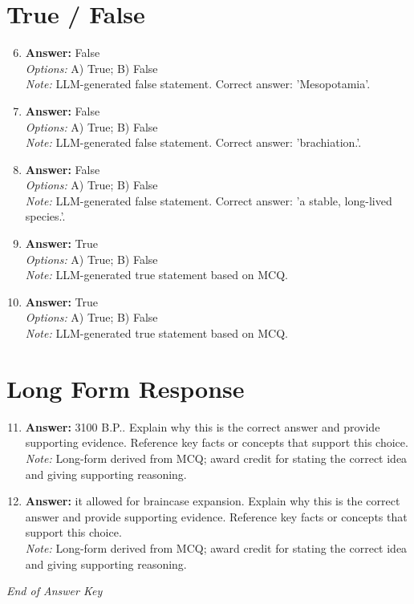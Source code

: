 \documentclass[12pt]{article}
\begin{document}
\section*{True / False}
\begin{enumerate}[label=\arabic*.]
\setcounter{enumi}{5}
\item \textbf{Answer:} False
\\ \textit{Options:} A) True; B) False
\\ \textit{Note:} LLM-generated false statement. Correct answer: 'Mesopotamia'.
\item \textbf{Answer:} False
\\ \textit{Options:} A) True; B) False
\\ \textit{Note:} LLM-generated false statement. Correct answer: 'brachiation.'.
\item \textbf{Answer:} False
\\ \textit{Options:} A) True; B) False
\\ \textit{Note:} LLM-generated false statement. Correct answer: 'a stable, long-lived species.'.
\item \textbf{Answer:} True
\\ \textit{Options:} A) True; B) False
\\ \textit{Note:} LLM-generated true statement based on MCQ.
\item \textbf{Answer:} True
\\ \textit{Options:} A) True; B) False
\\ \textit{Note:} LLM-generated true statement based on MCQ.
\end{enumerate}

\section*{Long Form Response}
\begin{enumerate}[label=\arabic*.]
\setcounter{enumi}{10}
\item \textbf{Answer:} 3100 B.P.. Explain why this is the correct answer and provide supporting evidence. Reference key facts or concepts that support this choice.
\\ \textit{Note:} Long-form derived from MCQ; award credit for stating the correct idea and giving supporting reasoning.
\item \textbf{Answer:} it allowed for braincase expansion. Explain why this is the correct answer and provide supporting evidence. Reference key facts or concepts that support this choice.
\\ \textit{Note:} Long-form derived from MCQ; award credit for stating the correct idea and giving supporting reasoning.
\end{enumerate}

\vfill
\noindent\textit{End of Answer Key}
\end{document}
